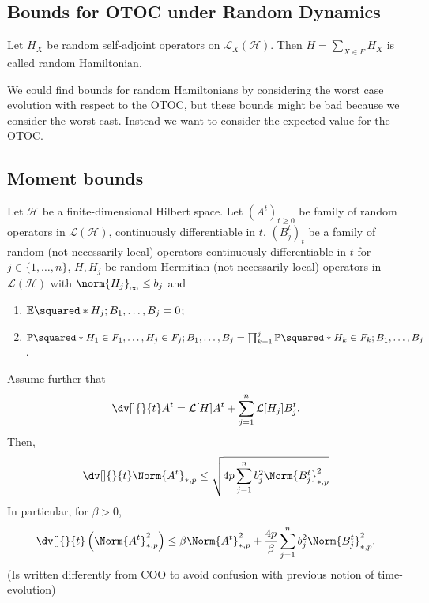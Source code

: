 \subsection{Bounds for OTOC under Random Dynamics}


\begin{defn}
   Let \( H_X\) be random self-adjoint operators on \( \mathcal{L}_X(\mathcal{H}) \). Then \( H= \sum_{X \in F}^{} H_X \) is called random Hamiltonian.
\end{defn}


\begin{remark}[Problems]
    We could find bounds for random Hamiltonians by considering the worst case evolution with respect to the OTOC, but these bounds might be bad because we consider the worst cast. Instead we want to consider the expected value for the OTOC.
\end{remark}



\subsection{Moment bounds}



\begin{lem}

  Let \(\mathcal{H}\) be a finite-dimensional Hilbert space. Let \((A^{t})_{t\geq 0}\) be family of random operators in \(\mathcal{L}(\mathcal{H})\), continuously differentiable in \(t\), \((B^{t}_j)_t\) be a family of random (not necessarily local) operators continuously differentiable in \(t\) for \(j\in \{1,\dots,n\}\), \(H, H_j\) be random Hermitian (not necessarily local) operators in \(\mathcal{L}(\mathcal{H})\) with \(\norm{H_j}_{\infty} \leq b_j\) and 
  \begin{enumerate}[1)]
    \item \(\mathbb{E} \squared*{H_j ; B_1, \dots, B_j}=0 \);  
    \item \(\mathbb{P} \squared*{H_{1}\in F_1,\dots, H_{j}\in F_j ; B_1,\dots, B_j}=\prod_{k=1}^{j} \mathbb{P}\squared*{H_{k}\in F_k;B_1, \dots, B_j} \).
  \end{enumerate}
  Assume further that 
  \[\dv[]{}{t}A^{t}= \mathcal{L}[H]A^{t}+ \sum_{j=1}^{n} \mathcal{L}[H_j]B^{t}_j.  \]
Then, 
\[ \dv[]{}{t} \Norm{A^{t}}_{*,p} \leq \sqrt{4p \sum_{j=1}^{n} b_j^{2} \Norm{B^{t}_j}^{2}_{*,p}}\]
In particular, for \(\beta>0\),
\[ \dv[]{}{t}\left(\Norm{A^{t}}_{*,p}^{2}\right) \leq \beta \Norm{A^{t}}^{2}_{*,p} + \frac{4p}{\beta} \sum_{j=1}^{n} b_j^{2}\Norm{B^{t}_j}^{2}_{*,p}. \]
    (Is written differently from COO to avoid confusion with previous notion of time-evolution)
\end{lem}

